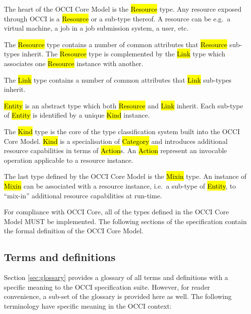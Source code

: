 \documentclass[10pt,a4paper]{article}
\begin{document}
The heart of the OCCI Core Model is the \hl{Resource} type. Any
resource exposed through OCCI is a \hl{Resource} or a sub-type
thereof.  A resource can be e.g.~a virtual machine, a job in a job
submission system, a user, etc.

The \hl{Resource} type contains a number of common attributes that
\hl{Resource} sub-types inherit. The \hl{Resource} type is
complemented by the \hl{Link} type which associates one \hl{Resource}
instance with another.

The \hl{Link} type contains a number of common attributes that
\hl{Link} sub-types inherit.

\hl{Entity} is an abstract type which both \hl{Resource} and \hl{Link}
inherit.  Each sub-type of \hl{Entity} is identified by a unique
\hl{Kind} instance.

The \hl{Kind} type is the core of the type classification system built
into the OCCI Core Model. \hl{Kind} is a specialisation of
\hl{Category} and introduces additional resource capabilities in terms
of \hl{Action}s.  An \hl{Action} represent an invocable operation
applicable to a resource instance.

The last type defined by the OCCI Core Model is the \hl{Mixin}
type. An instance of \hl{Mixin} can be associated with a resource
instance, i.e.~a sub-type of \hl{Entity}, to ``mix-in'' additional
resource capabilities at run-time.

For compliance with OCCI Core, all of the types defined in the OCCI
Core Model MUST be implemented.  The following sections of the
specification contain the formal definition of the OCCI Core Model.

\subsection{Terms and definitions}
Section \ref{sec:glossary} provides a glossary of all terms and
definitions with a specific meaning to the OCCI specification
suite. However, for reader convenience, a sub-set of the glossary is
provided here as well. The following terminology have specific meaning
in the OCCI context:
\end{document}
